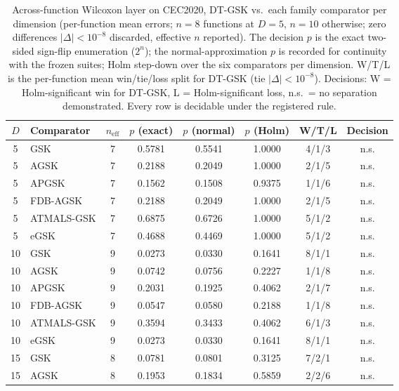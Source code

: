 \documentclass[algorithms,article,submit,moreauthors,pdftex]{Definitions/mdpi}
\newcommand{\dtgsk}{DT-GSK}
\newcommand{\zebra}{}
\begin{document}
\begin{table}[p]
\caption{Across-function Wilcoxon layer on CEC2020, \dtgsk{} vs.\ each
family comparator per dimension (per-function mean errors; $n = 8$
functions at $D = 5$, $n = 10$ otherwise; zero differences
$|\Delta| < 10^{-8}$ discarded, effective $n$ reported).  The decision
$p$ is the exact two-sided sign-flip enumeration ($2^{n}$); the
normal-approximation $p$ is recorded for continuity with the frozen
suites; Holm step-down over the six comparators per dimension.  W/T/L is
the per-function mean win/tie/loss split for \dtgsk{} (tie
$|\Delta| < 10^{-8}$).  Decisions: W = Holm-significant win for
\dtgsk{}, L = Holm-significant loss, n.s.\ = no separation
demonstrated.  Every row is decidable under the registered rule.
}\label{tab:supp:cec2020:pairwise}
\centering
\tablesize{\footnotesize}
\zebra
\begin{tabular}{clcccccc}
\toprule
\textbf{$D$} & \textbf{Comparator} & \textbf{$n_{\mathrm{eff}}$} &
\textbf{$p$ (exact)} & \textbf{$p$ (normal)} & \textbf{$p$ (Holm)} &
\textbf{W/T/L} & \textbf{Decision} \\
\midrule
5 & GSK & 7 & 0.5781 & 0.5541 & 1.0000 & 4/1/3 & n.s. \\
5 & AGSK & 7 & 0.2188 & 0.2049 & 1.0000 & 2/1/5 & n.s. \\
5 & APGSK & 7 & 0.1562 & 0.1508 & 0.9375 & 1/1/6 & n.s. \\
5 & FDB-AGSK & 7 & 0.2188 & 0.2049 & 1.0000 & 2/1/5 & n.s. \\
5 & ATMALS-GSK & 7 & 0.6875 & 0.6726 & 1.0000 & 5/1/2 & n.s. \\
5 & eGSK & 7 & 0.4688 & 0.4469 & 1.0000 & 5/1/2 & n.s. \\
\midrule
10 & GSK & 9 & 0.0273 & 0.0330 & 0.1641 & 8/1/1 & n.s. \\
10 & AGSK & 9 & 0.0742 & 0.0756 & 0.2227 & 1/1/8 & n.s. \\
10 & APGSK & 9 & 0.2031 & 0.1925 & 0.4062 & 2/1/7 & n.s. \\
10 & FDB-AGSK & 9 & 0.0547 & 0.0580 & 0.2188 & 1/1/8 & n.s. \\
10 & ATMALS-GSK & 9 & 0.3594 & 0.3433 & 0.4062 & 6/1/3 & n.s. \\
10 & eGSK & 9 & 0.0273 & 0.0330 & 0.1641 & 8/1/1 & n.s. \\
\midrule
15 & GSK & 8 & 0.0781 & 0.0801 & 0.3125 & 7/2/1 & n.s. \\
15 & AGSK & 8 & 0.1953 & 0.1834 & 0.5859 & 2/2/6 & n.s. \\

\end{tabular}
\end{table}
\end{document}
